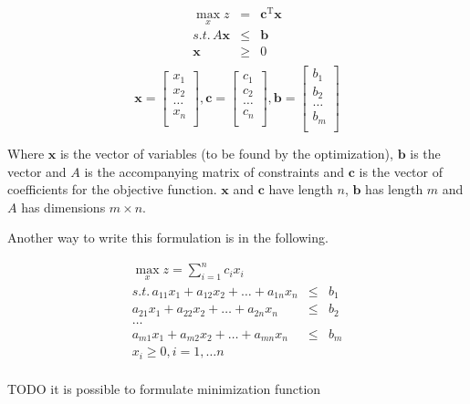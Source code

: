 \begin{eqnarray*}
\max_{x} z & = & \mathbf{c}^{\mathrm{T}}\mathbf{x} \\
s.t.\, A\mathbf{x} & \leqslant & \mathbf{b} \\
\mathbf{x} & \geqslant & 0 \\
\end{eqnarray*}
\[
\mathbf{x} =
\begin{bmatrix}
x_1 \\
x_2 \\
\ldots \\
x_n \\
\end{bmatrix},
\mathbf{c} = 
\begin{bmatrix}
c_1 \\
c_2 \\
\ldots \\
c_n \\
\end{bmatrix},
\mathbf{b} =
\begin{bmatrix}
b_1 \\
b_2 \\
\ldots \\
b_m \\
\end{bmatrix}
\]

Where $\mathbf{x}$ is the vector of variables (to be found by the optimization), $\mathbf{b}$ is the vector and $A$ is the accompanying matrix of constraints and $\mathbf{c}$ is the vector of coefficients for the objective function. $\mathbf{x}$ and $\mathbf{c}$ have length $n$, $\mathbf{b}$ has length $m$ and $A$ has dimensions $m \times n$.

Another way to write this formulation is in the following.

\begin{eqnarray*}
\max_{x} z = \sum_{i=1}^{n} c_i x_i \\
s.t.\, a_{11}x_{1} + a_{12}x_{2} + \ldots + a_{1n}x_{n} & \leqslant & b_{1} \\
	   a_{21}x_{1} + a_{22}x_{2} + \ldots + a_{2n}x_{n} & \leqslant & b_{2} \\
	   \ldots \\
	   a_{m1}x_{1} + a_{m2}x_{2} + \ldots + a_{mn}x_{n} & \leqslant & b_{m} \\
	   x_i \geqslant 0, i = 1, \ldots n \\
\end{eqnarray*}

TODO it is possible to formulate minimization function
